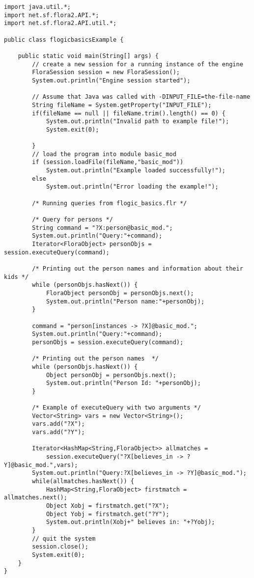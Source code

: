 \begin{verbatim}
import java.util.*;
import net.sf.flora2.API.*;
import net.sf.flora2.API.util.*;

public class flogicbasicsExample {

    public static void main(String[] args) {
        // create a new session for a running instance of the engine
        FloraSession session = new FloraSession();
        System.out.println("Engine session started");

        // Assume that Java was called with -DINPUT_FILE=the-file-name
        String fileName = System.getProperty("INPUT_FILE");
        if(fileName == null || fileName.trim().length() == 0) {
            System.out.println("Invalid path to example file!");
            System.exit(0);

        }
        // load the program into module basic_mod
        if (session.loadFile(fileName,"basic_mod"))
            System.out.println("Example loaded successfully!");
        else
            System.out.println("Error loading the example!");

        /* Running queries from flogic_basics.flr */

        /* Query for persons */
        String command = "?X:person@basic_mod.";
        System.out.println("Query:"+command);
        Iterator<FloraObject> personObjs = session.executeQuery(command);

        /* Printing out the person names and information about their kids */
        while (personObjs.hasNext()) {
            FloraObject personObj = personObjs.next();
            System.out.println("Person name:"+personObj);
        }

        command = "person[instances -> ?X]@basic_mod.";
        System.out.println("Query:"+command);
        personObjs = session.executeQuery(command);

        /* Printing out the person names  */
        while (personObjs.hasNext()) {
            Object personObj = personObjs.next();
            System.out.println("Person Id: "+personObj);
        }

        /* Example of executeQuery with two arguments */
        Vector<String> vars = new Vector<String>();
        vars.add("?X");
        vars.add("?Y");

        Iterator<HashMap<String,FloraObject>> allmatches =
            session.executeQuery("?X[believes_in -> ?Y]@basic_mod.",vars);
        System.out.println("Query:?X[believes_in -> ?Y]@basic_mod.");
        while(allmatches.hasNext()) {
            HashMap<String,FloraObject> firstmatch = allmatches.next();
            Object Xobj = firstmatch.get("?X");
            Object Yobj = firstmatch.get("?Y");
            System.out.println(Xobj+" believes in: "+?Yobj);
        }
        // quit the system
        session.close();
        System.exit(0);
    }
}
\end{verbatim}

